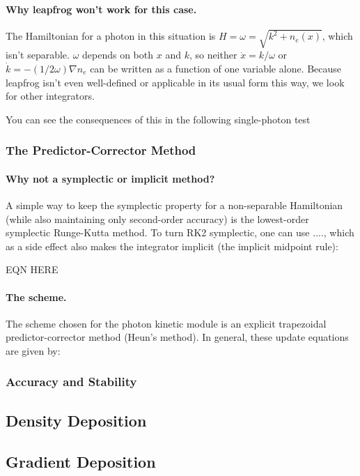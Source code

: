 \paragraph{Why leapfrog won't work for this case.} The Hamiltonian for a 
photon in this situation is $H = \omega = \sqrt{k^2 + n_e(x)}$, which isn't 
separable. $\omega$ depends on both $x$ and $k$, so neither $\dot{x} = k/\omega$
or $\dot{k} = -(1/2\omega)\nabla n_e$ can be written as a function of one 
variable alone. Because leapfrog isn't even well-defined or applicable in its
usual form this way, we look for other integrators.

You can see the consequences of this in the following single-photon test

\subsubsection{The Predictor-Corrector Method}
\paragraph{Why not a symplectic or implicit method?} A simple way to keep the
symplectic property for a non-separable Hamiltonian (while also maintaining only
second-order accuracy) is the lowest-order symplectic Runge-Kutta method. 
To turn RK2 symplectic, one can use ...., which as a side effect also makes the
integrator implicit (the implicit midpoint rule):

EQN HERE

\paragraph{The scheme.} The scheme chosen for the photon kinetic module is an 
explicit trapezoidal predictor-corrector method (Heun's method). In general, 
these update equations are given by:


\subsubsection{Accuracy and Stability}


\subsection{Density Deposition}


\subsection{Gradient Deposition}
